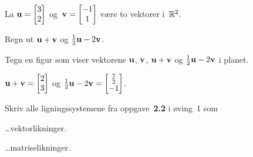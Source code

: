 
\begin{oppgave}
La $\mathbf{u} = \begin{bmatrix} 3 \\ 2 \end{bmatrix}$ og~$\mathbf{v} = \begin{bmatrix} -1 \\ 1 \end{bmatrix}$ være to vektorer
i~$\mathbb{R}^2$.

\begin{punkt}
Regn ut $\mathbf{u} + \mathbf{v}$ og $\frac{1}{2} \mathbf{u} - 2 \mathbf{v}$.
\end{punkt}

\begin{punkt}
Tegn en figur som viser vektorene $\mathbf{u}$, $\mathbf{v}$, $\mathbf{u} + \mathbf{v}$ og
$\frac{1}{2} \mathbf{u} - 2 \mathbf{v}$ i planet.
\end{punkt}
\end{oppgave}

\begin{losning}
\begin{punkt}
	$\mathbf{u} + \mathbf{v}=
	\begin{bmatrix}
	2\\
	3
	\end{bmatrix}
	$ og $\frac{1}{2} \mathbf{u} - 2 \mathbf{v}=
	\begin{bmatrix}
	\frac{7}{2}\\
	-1
	\end{bmatrix}
	$.
\end{punkt}

\begin{punkt}
\end{punkt}
\begin{center}
\end{center}
\end{losning}

\begin{oppgave}
Skriv alle ligningssystemene fra oppgave~\textbf{2.2} i øving~1 som

\begin{punkt}
\ldots vektorlikninger.
\end{punkt}

\begin{punkt}
\ldots matriselikninger.
\end{punkt}

\end{oppgave}

